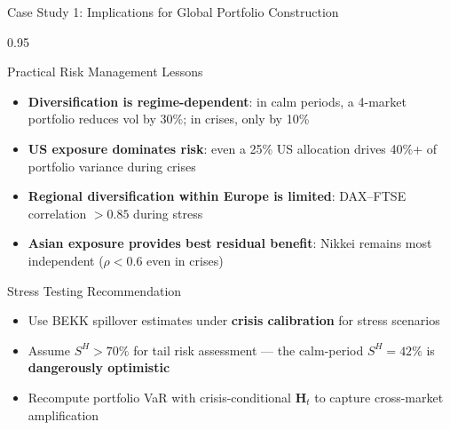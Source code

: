 \documentclass[9pt, aspectratio=169, t]{beamer}
\begin{document}
\begin{frame}{Case Study 1: Implications for Global Portfolio Construction}
    \begin{cminipage}{0.95\textwidth}
    {\footnotesize
    \begin{block}{Practical Risk Management Lessons}
        \begin{itemize}\setlength{\itemsep}{1pt}
            \item \textbf{Diversification is regime-dependent}: in calm periods, a 4-market portfolio reduces vol by 30\%; in crises, only by 10\%
            \item \textbf{US exposure dominates risk}: even a 25\% US allocation drives 40\%+ of portfolio variance during crises
            \item \textbf{Regional diversification within Europe is limited}: DAX--FTSE correlation $> 0.85$ during stress
            \item \textbf{Asian exposure provides best residual benefit}: Nikkei remains most independent ($\rho < 0.6$ even in crises)
        \end{itemize}
    \end{block}
    \begin{alertblock}{Stress Testing Recommendation}
        \begin{itemize}\setlength{\itemsep}{0pt}
            \item Use BEKK spillover estimates under \textbf{crisis calibration} for stress scenarios
            \item Assume $S^H > 70\%$ for tail risk assessment --- the calm-period $S^H = 42\%$ is \textbf{dangerously optimistic}
            \item Recompute portfolio VaR with crisis-conditional $\mathbf{H}_t$ to capture cross-market amplification
        \end{itemize}
    \end{alertblock}
    }
    \end{cminipage}
\end{frame}
\end{document}
